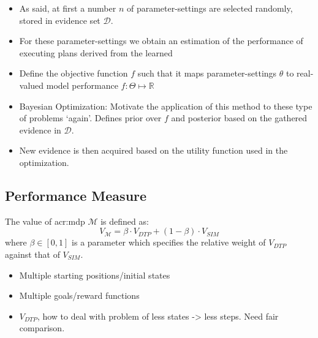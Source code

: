 \begin{itemize}
	\item As said, at first a number $n$ of parameter-settings are selected randomly, stored in evidence set $\mathcal{D}$.
	\item For these parameter-settings we obtain an estimation of the performance of executing plans derived from the learned 
	\item Define the objective function $f$ such that it maps parameter-settings $\theta$ to real-valued model performance $f: \Theta \mapsto \mathbb{R}$ 
	\item Bayesian Optimization: Motivate the application of this method to these type of problems `again'. Defines prior over $f$ and posterior based on the gathered evidence in $\mathcal{D}$.
	\item New evidence is then acquired based on the utility function used in the optimization.
\end{itemize}

\subsection{Performance Measure}
\label{sec:performance-measure}


The value of \acrshort{acr:mdp} $\mathcal{M}$ is defined as:
\begin{equation}
	V_{\mathcal{M}} = \beta \cdot V_\mathit{DTP} + (1 - \beta) \cdot V_\mathit{SIM}
\end{equation}
where $\beta \in [0, 1]$ is a parameter which specifies the relative weight of $V_\mathit{DTP}$ against that of $V_\mathit{SIM}$.

\begin{itemize}
	\item Multiple starting positions/initial states
	\item Multiple goals/reward functions
	\item $V_\mathit{DTP}$, how to deal with problem of less states -> less steps. Need fair comparison.
\end{itemize}

